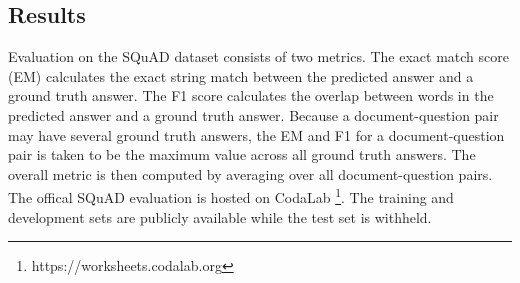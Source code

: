 \documentclass{article} \usepackage{iclr2017_conference,times}
\begin{document}
\subsection{Results}

Evaluation on the SQuAD dataset consists of two metrics. The exact match score (EM) calculates the exact string match between the predicted answer and a ground truth answer. The F1 score calculates the overlap between words in the predicted answer and a ground truth answer.
Because a document-question pair may have several ground truth answers, the EM and F1 for a document-question pair is taken to be the maximum value across all ground truth answers.
The overall metric is then computed by averaging over all document-question pairs.
The offical SQuAD evaluation is hosted on CodaLab
\footnote{https://worksheets.codalab.org}.
The training and development sets are publicly available while the test set is withheld.

\newcommand{\unpublished}{$^*$}
\end{document}
